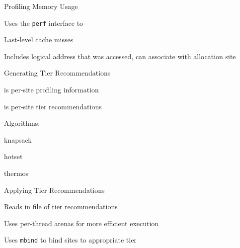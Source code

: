 \documentclass[final,hyperref={pdfpagelabels=false}]{beamer}
\begin{document}
\begin{frame}{Profiling Memory Usage}
  \begin{customlist}{0em}{0em}
    \item Uses the \texttt{perf} interface to 
    \item Last-level cache misses
    \item Includes logical address that was accessed, can associate with allocation site
  \end{customlist}
\end{frame}

\begin{frame}[fragile]{Generating Tier Recommendations}
  \begin{customlist}{0em}{0em}
    \item {} is per-site profiling information
    \item {} is per-site tier recommendations
    \item Algorithms:
    \begin{customlist}{1em}{0em}
      \item knapsack
      \item hotset
      \item thermos
    \end{customlist}
  \end{customlist}
  \vspace{2em}
  \begin{center}
  \end{center}
\end{frame}

\begin{frame}{Applying Tier Recommendations}
  \begin{customlist}{0em}{0em}
    \item Reads in file of tier recommendations
    \item Uses per-thread arenas for more efficient execution
    \item Uses \texttt{mbind} to bind sites to appropriate tier
  \end{customlist}
  \vspace{2em}
\end{frame}
\end{document}
